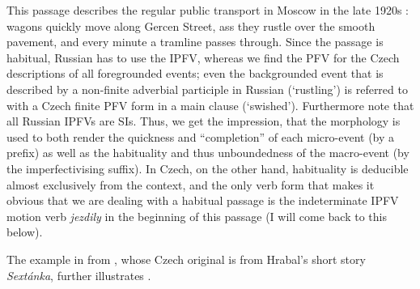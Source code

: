 \documentclass[output=paper,colorlinks,citecolor=brown]{langscibook}
\begin{document}
\noindent This passage describes the regular public transport in Moscow in the late 1920s%
: wagons quickly move along Gercen Street, ass they rustle over the smooth pavement, and every minute a tramline passes through. Since the passage is habitual, Russian has to use the IPFV, whereas we find the PFV for the Czech descriptions of all foregrounded events; even the backgrounded event that is described by a non-finite adverbial participle in Russian (`rustling') is referred to with a Czech finite PFV form in a main clause (`swished'). Furthermore note that all Russian IPFVs are SIs. Thus, we get the impression, that the morphology is used to both render the quickness and ``completion'' of each micro-event (by a prefix) as well as the habituality and thus unboundedness of the macro-event (by the imperfectivising suffix). In Czech, on the other hand, habituality is deducible almost exclusively from the context, and the only verb form that makes it obvious that we are dealing with a habitual passage is the indeterminate IPFV motion verb \textit{jezdily} in the beginning of this passage (I will come back to this below). 

\iffalse
The example in  from \citet[][85]{gehrke02}, whose Czech original is from Hrabal's short story \textit{Sextánka}, further illustrates \citep[discussed in][]{gehrke02}.
\end{document}
